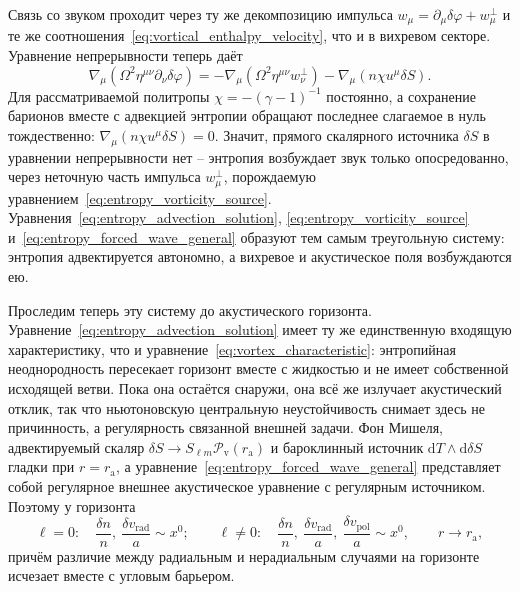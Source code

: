 \documentclass[12pt,a4paper,preprint,nopreprintline]{elsarticle}
\begin{document}
Связь со звуком проходит через ту же декомпозицию импульса $w_{\mu}=\partial_{\mu}\delta\varphi+w_{\mu}^{\perp}$ и те же соотношения~\eqref{eq:vortical_enthalpy_velocity}, что и в вихревом секторе. Уравнение непрерывности теперь даёт
\begin{equation}
    \nabla_{\mu}
    \left(
        \Omega^{2}\eta^{\mu\nu}\partial_{\nu}\delta\varphi
    \right)
    =
    -
    \nabla_{\mu}
    \left(
        \Omega^{2}\eta^{\mu\nu}w_{\nu}^{\perp}
    \right)
    -
    \nabla_{\mu}
    \left(
        n\chi u^{\mu}\delta S
    \right).
    \label{eq:entropy_forced_wave_general}
\end{equation}
Для рассматриваемой политропы $\chi=-(\gamma-1)^{-1}$ постоянно, а сохранение барионов вместе с адвекцией энтропии обращают последнее слагаемое в нуль тождественно: $\nabla_{\mu}(n\chi u^{\mu}\delta S)=0$. Значит, прямого скалярного источника $\delta S$ в уравнении непрерывности нет -- энтропия возбуждает звук только опосредованно, через неточную часть импульса $w_{\mu}^{\perp}$, порождаемую уравнением~\eqref{eq:entropy_vorticity_source}. Уравнения~\eqref{eq:entropy_advection_solution}, \eqref{eq:entropy_vorticity_source} и~\eqref{eq:entropy_forced_wave_general} образуют тем самым треугольную систему: энтропия адвектируется автономно, а вихревое и акустическое поля возбуждаются ею.

Проследим теперь эту систему до акустического горизонта. Уравнение~\eqref{eq:entropy_advection_solution} имеет ту же единственную входящую характеристику, что и уравнение~\eqref{eq:vortex_characteristic}: энтропийная неоднородность пересекает горизонт вместе с жидкостью и не имеет собственной исходящей ветви. Пока она остаётся снаружи, она всё же излучает акустический отклик, так что ньютоновскую центральную неустойчивость снимает здесь не причинность, а регулярность связанной внешней задачи. Фон Мишеля, адвектируемый скаляр $\delta S\rightarrow S_{\ell m}\mathcal{P}_{\mathrm{v}}(r_{\mathrm{a}})$ и бароклинный источник $\mathrm{d}T\wedge\mathrm{d}\delta S$ гладки при $r=r_{\mathrm{a}}$, а уравнение~\eqref{eq:entropy_forced_wave_general} представляет собой регулярное внешнее акустическое уравнение с регулярным источником. Поэтому у горизонта
\begin{equation}
    \ell=0:
    \quad
    \frac{\delta n}{n},\
    \frac{\delta v_{\mathrm{rad}}}{a}
    \sim x^{0};
    \qquad
    \ell\neq0:
    \quad
    \frac{\delta n}{n},\
    \frac{\delta v_{\mathrm{rad}}}{a},\
    \frac{\delta v_{\mathrm{pol}}}{a}
    \sim x^{0},
    \qquad
    r \rightarrow r_{\mathrm{a}},
    \label{eq:michel_entropy_horizon_asymptotics}
\end{equation}
причём различие между радиальным и нерадиальным случаями на горизонте исчезает вместе с угловым барьером.
\end{document}
